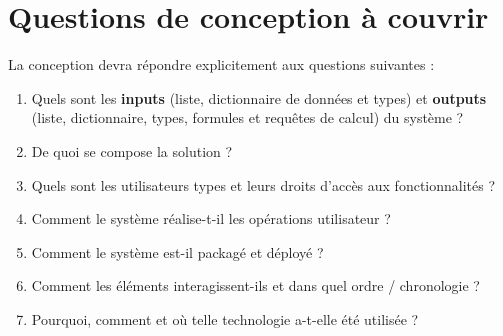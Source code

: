 \section{Questions de conception à couvrir}
La conception devra répondre explicitement aux questions suivantes :
\begin{enumerate}
  \item Quels sont les \textbf{inputs} (liste, dictionnaire de données et types) et \textbf{outputs} (liste, dictionnaire, types, formules et requêtes de calcul) du système ?
  \item De quoi se compose la solution ?
  \item Quels sont les utilisateurs types et leurs droits d'accès aux fonctionnalités ?
  \item Comment le système réalise-t-il les opérations utilisateur ?
  \item Comment le système est-il packagé et déployé ?
  \item Comment les éléments interagissent-ils et dans quel ordre / chronologie ?
  \item Pourquoi, comment et où telle technologie a-t-elle été utilisée ?
\end{enumerate}

